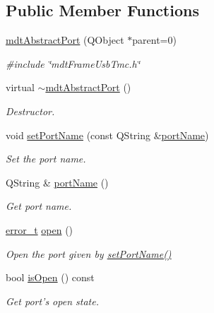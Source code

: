 \subsection*{Public Member Functions}
\begin{DoxyCompactItemize}
\item 
\hyperlink{classmdt_abstract_port_a35e7bff9413690833c832bf115da102f}{mdt\-Abstract\-Port} (Q\-Object $\ast$parent=0)
\begin{DoxyCompactList}\small\item\em \#include \char`\"{}mdt\-Frame\-Usb\-Tmc.\-h\char`\"{} \end{DoxyCompactList}\item 
virtual \hyperlink{classmdt_abstract_port_aa40baa0c593fef984f3796acafceee15}{$\sim$mdt\-Abstract\-Port} ()
\begin{DoxyCompactList}\small\item\em Destructor. \end{DoxyCompactList}\item 
void \hyperlink{classmdt_abstract_port_a0ca143d32fc677bac7c1cf0e04144932}{set\-Port\-Name} (const Q\-String \&\hyperlink{classmdt_abstract_port_ac52fbd121f7cbb848a2f3e5d29fae615}{port\-Name})
\begin{DoxyCompactList}\small\item\em Set the port name. \end{DoxyCompactList}\item 
Q\-String \& \hyperlink{classmdt_abstract_port_ac52fbd121f7cbb848a2f3e5d29fae615}{port\-Name} ()
\begin{DoxyCompactList}\small\item\em Get port name. \end{DoxyCompactList}\item 
\hyperlink{classmdt_abstract_port_ad4121bb930c95887e77f8bafa065a85e}{error\-\_\-t} \hyperlink{classmdt_abstract_port_a4e0f0b7f9e24257677184e4bde10fdde}{open} ()
\begin{DoxyCompactList}\small\item\em Open the port given by \hyperlink{classmdt_abstract_port_a0ca143d32fc677bac7c1cf0e04144932}{set\-Port\-Name()} \end{DoxyCompactList}\item 
bool \hyperlink{classmdt_abstract_port_a2122ae3141342ff38c8388e62b244e3b}{is\-Open} () const 
\begin{DoxyCompactList}\small\item\em Get port's open state. \end{DoxyCompactList}\item 

\end{DoxyCompactItemize}

